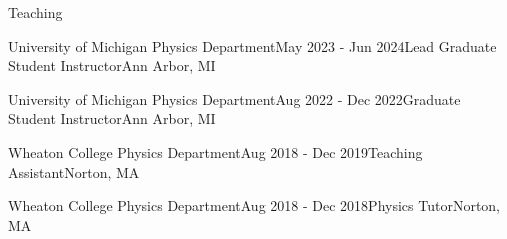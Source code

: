 \documentclass{resume} %
\begin{document}
\begin{rSection}{Teaching}

\begin{rSubsection}{University of Michigan Physics Department}{May 2023 - Jun 2024}{Lead Graduate Student Instructor}{Ann Arbor, MI}
    
\end{rSubsection}

\begin{rSubsection}{University of Michigan Physics Department}{Aug 2022 - Dec 2022}{Graduate Student Instructor}{Ann Arbor, MI}

\end{rSubsection}

\begin{rSubsection}{Wheaton College Physics Department}{Aug 2018 - Dec 2019}{Teaching Assistant}{Norton, MA}

\end{rSubsection}

\begin{rSubsection}{Wheaton College Physics Department}{Aug 2018 - Dec 2018}{Physics Tutor}{Norton, MA}

\end{rSubsection}

\end{rSection}
\end{document}
